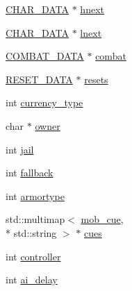 \begin{DoxyCompactItemize}
\hyperlink{structs_8h_af33ed1e66e8541a08bed257124f50f31}{C\-H\-A\-R\-\_\-\-D\-A\-T\-A} $\ast$ \hyperlink{structmob__data_a0b36b8495d419ef1ea7f71b069f32f50}{hnext}
\item 
\hyperlink{structs_8h_af33ed1e66e8541a08bed257124f50f31}{C\-H\-A\-R\-\_\-\-D\-A\-T\-A} $\ast$ \hyperlink{structmob__data_adf62fe08830155ef765c0cd06e80dd96}{lnext}
\item 
\hyperlink{structs_8h_aa5d57a5288e967c2f978917a0bdd248b}{C\-O\-M\-B\-A\-T\-\_\-\-D\-A\-T\-A} $\ast$ \hyperlink{structmob__data_a48a2f2ddfa6d865ff34602f8aa1d52e6}{combat}
\item 
\hyperlink{structs_8h_ab78d529b5a10f3e757885b70f902d46a}{R\-E\-S\-E\-T\-\_\-\-D\-A\-T\-A} $\ast$ \hyperlink{structmob__data_ace439f593d90207ac05d75f34db58f88}{resets}
\item 
int \hyperlink{structmob__data_a468fd7308031d96fe90dec94b2a90479}{currency\-\_\-type}
\item 
char $\ast$ \hyperlink{structmob__data_ae283015224d3cce92083d971872406b1}{owner}
\item 
int \hyperlink{structmob__data_aafe3b4337739cd440bfc06c1c6a94349}{jail}
\item 
int \hyperlink{structmob__data_ad0ac1aea7c9f0ce31778855623a5e8e7}{fallback}
\item 
int \hyperlink{structmob__data_a48f53ae8473244cec6f713910a550263}{armortype}
\item 
std\-::multimap$<$ \hyperlink{structs_8h_ab0d051a6637e08a4e250d05fc4aa001a}{mob\-\_\-cue}, \\*
std\-::string $>$ $\ast$ \hyperlink{structmob__data_a88707b282a1daaf4897b4732cbae9ecc}{cues}
\item 
int \hyperlink{structmob__data_a510f2eca7e0b6bec48d9b775924d0725}{controller}
\item 
int \hyperlink{structmob__data_a8be7bdb4c9a2c2d99c6cb90cada65bcf}{ai\-\_\-delay}
\end{DoxyCompactItemize}


